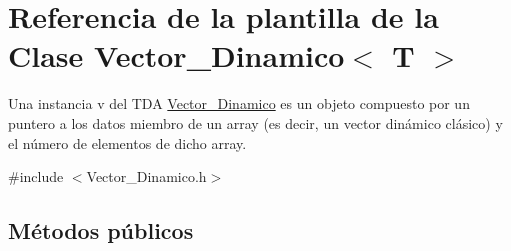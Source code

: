 \hypertarget{classVector__Dinamico}{}\section{Referencia de la plantilla de la Clase Vector\+\_\+\+Dinamico$<$ T $>$}
\label{classVector__Dinamico}


Una instancia v del T\+DA \mbox{\hyperlink{classVector__Dinamico}{Vector\+\_\+\+Dinamico}} es un objeto compuesto por un puntero a los datos miembro de un array (es decir, un vector dinámico clásico) y el número de elementos de dicho array.  




{\ttfamily \#include $<$Vector\+\_\+\+Dinamico.\+h$>$}

\subsection*{Métodos públicos}

